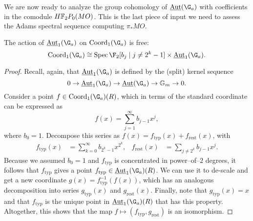 We are now ready to analyze the group cohomology of \(\InternalAut(\G_a)\) with coefficients in the comodule \(\HFtwo P_0(MO)\).  This is the last piece of input we need to assess the Adams spectral sequence computing \(\pi_* MO\).
\begin{theorem}\label{CalculationOfAutGaActionOnMO}
The action of \(\InternalAut_1(\G_a)\) on \(\Coord_1(\G_a)\) is free: \[\Coord_1(\G_a) \cong \Spec \F_2[b_j \mid j \ne 2^k - 1] \times \InternalAut_1(\G_a).\]
\end{theorem}
\begin{proof}
Recall, again, that \(\InternalAut_1(\G_a)\) is defined by the (split) kernel sequence \[0 \to \InternalAut_1(\G_a) \to \InternalAut(\G_a) \to \Gm \to 0.\]  Consider a point \(f \in \Coord_1(\G_a)(R)\), which in terms of the standard coordinate can be expressed as \[f(x) = \sum_{j=1}^\infty b_{j-1} x^j,\] where \(b_0 = 1\).  Decompose this series as \(f(x) = f_{\mathrm{typ}}(x) + f_{\mathrm{rest}}(x)\), with
\begin{align*}
f_{\mathrm{typ}}(x) & = \sum_{k=0}^\infty b_{2^k-1} x^{2^k}, &
f_{\mathrm{rest}}(x) & = \sum_{j \ne 2^k} b_{j-1} x^j.
\end{align*}
Because we assumed \(b_0 = 1\) and \(f_{\mathrm{typ}}\) is concentrated in power--of--\(2\) degrees, it follows that \(f_{\mathrm{typ}}\) gives a point \(f_{\mathrm{typ}} \in \InternalAut_1(\G_a)(R)\).  We can use it to de-scale and get a new coordinate \(g(x) = f_{\mathrm{typ}}^{-1}(f(x))\), which has an analogous decomposition into series \(g_{\mathrm{typ}}(x)\) and \(g_{\mathrm{rest}}(x)\).  Finally, note that \(g_{\mathrm{typ}}(x) = x\) and that \(f_{\mathrm{typ}}\) is the unique point in \(\InternalAut_1(\G_a)(R)\) that has this property.  Altogether, this shows that the map \(f \mapsto (f_{\mathrm{typ}}, g_{\mathrm{rest}})\) is an isomorphism.
\end{proof}


